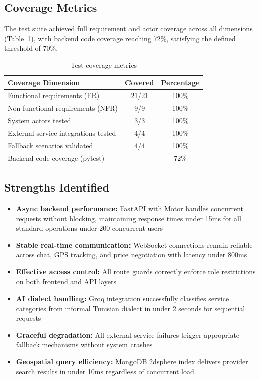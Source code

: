 \subsection{Coverage Metrics}
The test suite achieved full requirement and actor coverage across all dimensions (Table~\ref{tab:coverage}), with backend code coverage reaching 72\%, satisfying the defined threshold of 70\%.

\begin{table}[H]
\caption{Test coverage metrics}
\centering
\renewcommand{\arraystretch}{1.3}
\begin{tabular}{|l|c|c|}
\hline
\rowcolor{cyan!20}
\textbf{Coverage Dimension} & \textbf{Covered} & \textbf{Percentage} \\
\hline
Functional requirements (FR) & 21/21 & 100\% \\
\hline
Non-functional requirements (NFR) & 9/9 & 100\% \\
\hline
System actors tested & 3/3 & 100\% \\
\hline
External service integrations tested & 4/4 & 100\% \\
\hline
Fallback scenarios validated & 4/4 & 100\% \\
\hline
Backend code coverage (pytest) & -& 72\% \\
\hline
\end{tabular}

\label{tab:coverage}
\end{table}

\subsection{Strengths Identified}

\begin{itemize}[noitemsep]
    \item \textbf{Async backend performance:} FastAPI with Motor handles concurrent requests without blocking, maintaining response times under 15ms for all standard operations under 200 concurrent users
    \item \textbf{Stable real-time communication:} WebSocket connections remain reliable across chat, GPS tracking, and price negotiation with latency under 800ms
    \item \textbf{Effective access control:} All route guards correctly enforce role restrictions on both frontend and API layers
    \item \textbf{AI dialect handling:} Groq integration successfully classifies service categories from informal Tunisian dialect in under 2 seconds for sequential requests
    \item \textbf{Graceful degradation:} All external service failures trigger appropriate fallback mechanisms without system crashes
    \item \textbf{Geospatial query efficiency:} MongoDB 2dsphere index delivers provider search results in under 10ms regardless of concurrent load
\end{itemize}

